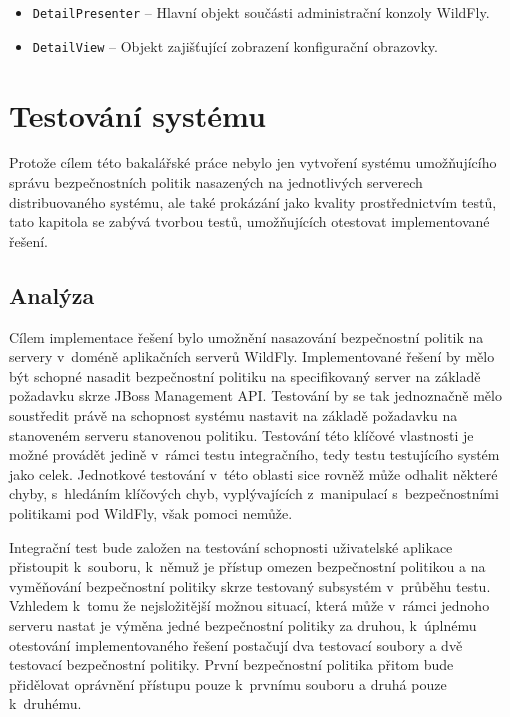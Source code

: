 \begin{itemize}
  \item {\tt DetailPresenter} -- Hlavní objekt součásti administrační konzoly WildFly.
  \item {\tt DetailView} -- Objekt zajišťující zobrazení konfigurační obrazovky.
\end{itemize}


\chapter{Testování systému} \label{testovani}

Protože cílem této bakalářské práce nebylo jen vytvoření systému umožňujícího správu bezpečnostních politik nasazených na jednotlivých serverech distribuovaného systému, ale také prokázání jako kvality prostřednictvím testů, tato kapitola se zabývá tvorbou testů, umožňujících otestovat implementované řešení.

\section{Analýza} %

Cílem implementace řešení bylo umožnění nasazování bezpečnostní politik na servery v~doméně aplikačních serverů WildFly.
Implementované řešení by mělo být schopné nasadit bezpečnostní politiku na specifikovaný server na základě požadavku skrze JBoss Management API.
Testování by se tak jednoznačně mělo soustředit právě na schopnost systému nastavit na základě požadavku na stanoveném serveru stanovenou politiku.
Testování této klíčové vlastnosti je možné provádět jedině v~rámci testu integračního, tedy testu testujícího systém jako celek.
Jednotkové testování v~této oblasti sice rovněž může odhalit některé chyby, s~hledáním klíčových chyb, vyplývajících z~manipulací s~bezpečnostními politikami pod WildFly, však pomoci nemůže.

Integrační test bude založen na testování schopnosti uživatelské aplikace přistoupit k~souboru, k~němuž je přístup omezen bezpečnostní politikou a na vyměňování bezpečnostní politiky skrze testovaný subsystém v~průběhu testu.
Vzhledem k~tomu že nejsložitější možnou situací, která může v~rámci jednoho serveru nastat je výměna jedné bezpečnostní politiky za druhou, k~úplnému otestování implementovaného řešení postačují dva testovací soubory a dvě testovací bezpečnostní politiky.
První bezpečnostní politika přitom bude přidělovat oprávnění přístupu pouze k~prvnímu souboru a druhá pouze k~druhému.

